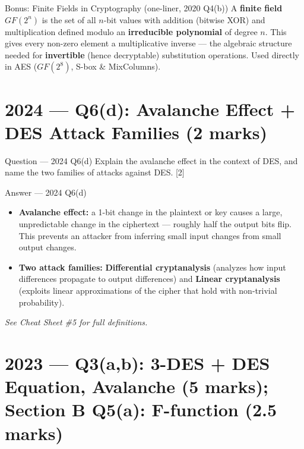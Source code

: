 \documentclass[12pt,a4paper]{article}
\begin{document}
\begin{algobox}{Bonus: Finite Fields in Cryptography (one-liner, 2020 Q4(b))}
A \textbf{finite field $GF(2^n)$} is the set of all $n$-bit values with addition (bitwise XOR) and multiplication defined modulo an \textbf{irreducible polynomial} of degree $n$. This gives every non-zero element a multiplicative inverse --- the algebraic structure needed for \textbf{invertible} (hence decryptable) substitution operations. Used directly in AES ($GF(2^8)$, S-box \& MixColumns).
\end{algobox}

\newpage
\section{2024 --- Q6(d): Avalanche Effect + DES Attack Families (2 marks)}

\begin{qbox}{Question --- 2024 Q6(d)}
Explain the avalanche effect in the context of DES, and name the two families of attacks against DES. \hfill [2]
\end{qbox}

\begin{solbox}{Answer --- 2024 Q6(d)}
\begin{itemize}[noitemsep]
  \item \textbf{Avalanche effect:} a 1-bit change in the plaintext or key causes a large, unpredictable change in the ciphertext --- roughly half the output bits flip. This prevents an attacker from inferring small input changes from small output changes.
  \item \textbf{Two attack families:} \textbf{Differential cryptanalysis} (analyzes how input differences propagate to output differences) and \textbf{Linear cryptanalysis} (exploits linear approximations of the cipher that hold with non-trivial probability).
\end{itemize}
\textit{See Cheat Sheet \#5 for full definitions.}
\end{solbox}

\newpage
\section{2023 --- Q3(a,b): 3-DES + DES Equation, Avalanche (5 marks); Section B Q5(a): F-function (2.5 marks)}
\end{document}
